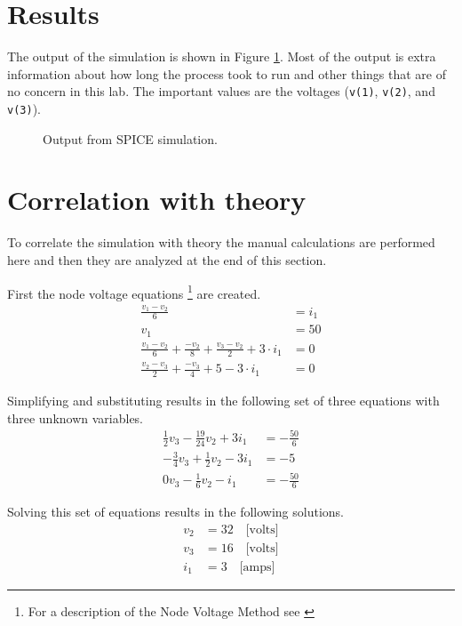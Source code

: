 \documentclass{article}
\begin{document}
\section{Results}

The output of the simulation is shown in Figure \ref{fig:out}.
Most of the output is extra information about how long the process took
to run and other things that are of no concern in this lab.
The important values are the voltages (\verb+v(1)+, \verb+v(2)+, and \verb+v(3)+).

\begin{figure}[!hbtp]

\caption{Output from SPICE simulation.}
\label{fig:out}
\end{figure}

\clearpage


\section{Correlation with theory}

To correlate the simulation with theory the manual calculations are
performed here and then they are analyzed at the end of this section.

First the node voltage equations
\footnote{For a description of the Node Voltage Method see \cite[Pg. 97]{nilsson2008electric}} are created.
\begin{align}
\frac{v_1 - v_2}{6} &= i_1 \\
v_1 &= 50 \\
\frac{v_1 - v_2}{6} + \frac{-v_2}{8} + \frac{v_3 - v_2}{2} + 3 \cdot i_1 &= 0 \\
\frac{v_2 - v_3}{2} + \frac{-v_3}{4} + 5 - 3 \cdot i_1 &= 0
\end{align}

Simplifying and substituting results in the following set of three equations
with three unknown variables.
\begin{align}
	\frac{1}{2} v_3 - \frac{19}{24} v_2 + 3 i_1 &= -\frac{50}{6} \\
	-\frac{3}{4} v_3 + \frac{1}{2} v_2 - 3 i_1 &= -5 \\
	0 v_3 - \frac{1}{6} v_2 - i_1 &= -\frac{50}{6}
\end{align}

Solving this set of equations results in the following solutions.
\begin{align}
	v_2 &= 32 \quad \mbox{[volts]} \label{eq:v2} \\
	v_3 &= 16 \quad \mbox{[volts]} \label{eq:v3} \\
	i_1 &= 3 \quad \mbox{[amps]}
\end{align}
\end{document}
